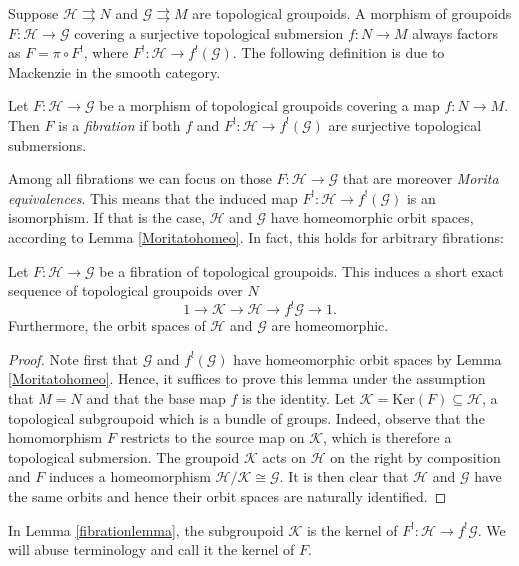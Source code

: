 \documentclass[10pt]{amsart}
\numberwithin{theoremalpha}{section}
\numberwithin{equation}{section}
\numberwithin{definition}{section}
\numberwithin{theorem}{section}
\numberwithin{proposition}{section}
\numberwithin{lemma}{section}
\numberwithin{example}{section}
\numberwithin{remark}{section}
\numberwithin{corollary}{section}
\numberwithin{question}{section}
\numberwithin{problem}{section}
\numberwithin{assumption}{section}
\theoremstyle{named}
\numberwithin{equation}{section}
\begin{document}
Suppose $\mathcal{H} \rightrightarrows N$ and $\mathcal{G} \rightrightarrows M$ are topological groupoids. A morphism of groupoids $F: \mathcal{H} \to \mathcal{G}$ covering a surjective topological submersion $f: N \to M$ always factors as $F = \pi \circ F^{!}$, where $F^{!} : \mathcal{H} \to f^{!}(\mathcal{G})$. The following definition is due to Mackenzie \cite{MR896907} in the smooth category. 
\begin{definition}
Let $F: \mathcal{H} \to \mathcal{G}$ be a morphism of topological groupoids covering a map $f: N \to M$. Then $F$ is a \emph{fibration} if both $f$ and $F^{!} : \mathcal{H} \to f^{!}(\mathcal{G})$ are surjective topological submersions. 
\end{definition}
Among all fibrations we can focus on those $F: \mathcal{H} \to \mathcal{G}$ that are moreover \emph{Morita equivalences}. This means that the induced map $F^{!} : \mathcal{H} \to f^{!}(\mathcal{G})$ is an isomorphism. If that is the case, $\mathcal{H}$ and $\mathcal{G}$ have homeomorphic orbit spaces, according to Lemma \ref{Moritatohomeo}. In fact, this holds for arbitrary fibrations:
\begin{lemma} \label{fibrationlemma}
Let $F : \mathcal{H} \to \mathcal{G}$ be a fibration of topological groupoids. This induces a short exact sequence of topological groupoids over $N$
\[
1 \to \mathcal{K} \to \mathcal{H} \to f^{!}\mathcal{G} \to 1.
\]
Furthermore, the orbit spaces of $\mathcal{H}$ and $\mathcal{G}$ are homeomorphic. 
\end{lemma}
\begin{proof}
Note first that $\mathcal{G}$ and $f^{!}(\mathcal{G})$ have homeomorphic orbit spaces by Lemma \ref{Moritatohomeo}. Hence, it suffices to prove this lemma under the assumption that $M = N$ and that the base map $f$ is the identity. Let $\mathcal{K} = \mathrm{Ker}(F) \subseteq \mathcal{H}$, a topological subgroupoid which is a bundle of groups. Indeed, observe that the homomorphism $F$ restricts to the source map on $\mathcal{K}$, which is therefore a topological submersion. The groupoid $\mathcal{K}$ acts on $\mathcal{H}$ on the right by composition and $F$ induces a homeomorphism $\mathcal{H}/\mathcal{K} \cong \mathcal{G}$. It is then clear that $\mathcal{H}$ and $\mathcal{G}$ have the same orbits and hence their orbit spaces are naturally identified. 
\end{proof}
\begin{remark} In Lemma \ref{fibrationlemma}, the subgroupoid $\mathcal{K}$ is the kernel of $F^{!}: \mathcal{H} \to f^{!}\mathcal{G}$. We will abuse terminology and call it the kernel of $F$. 
\end{remark}
\end{document}
